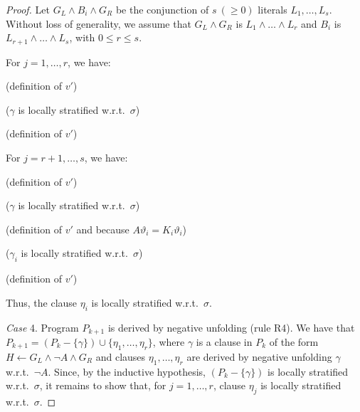 \documentclass[english]{tlp}
\begin{document}
\begin{proof}
Let $G_L\wedge B_i\wedge G_R$ be the conjunction of $s\ (\geq 0)$
literals $L_1,\ldots, L_s$. Without loss of generality, we assume
that $G_{L}\wedge G_{R}$ is $L_1\wedge\ldots\wedge L_r$ and $B_i$ is
$L_{r+1}\wedge\ldots\wedge L_s$, with $0\leq r \leq s$.

\noindent For $j=1,\ldots,r$, we have:

\smallskip

  (definition of $v'$)

\hspace*{1.75cm}  ($\gamma$
is locally stratified w.r.t.~$\sigma$)

\hspace*{1.75cm} 
(definition of $v'$)

\smallskip

\noindent \noindent For $j=r+1,\ldots,s$, we have:


\smallskip

  (definition of $v'$)

\hspace*{1.75cm}  ($\gamma$ is
locally stratified w.r.t.~$\sigma$)

\hspace*{1.75cm}  (definition of
$v'$ and because $A\vartheta_i=K_i\vartheta_i$)

\hspace*{1.75cm} 
($\gamma_i$ is locally stratified w.r.t.~$\sigma$)

\hspace*{1.75cm} 
(definition of $v'$)

\smallskip

\noindent Thus, the clause \( \eta _{i} \) is locally stratified
w.r.t.~\( \sigma  \).

\medskip

\noindent \emph{Case} 4. Program \( P_{k+1} \) is derived by
negative unfolding (rule R4). We have that \(
P_{k+1}=(P_{k}-\{\gamma \})\cup \{\eta _{1},\ldots ,\eta _{r}\} \),
where \( \gamma  \) is a clause in \( P_{k} \) of the form \(
H\leftarrow G_{L}\wedge \neg A\wedge G_{R} \) and clauses \( \eta
_{1},\ldots ,\eta _{r} \) are derived by negative unfolding \(
\gamma \) w.r.t.~\( \neg A \). Since, by the inductive hypothesis,
\( (P_{k}-\{\gamma \}) \) is locally stratified w.r.t.~\( \sigma \),
it remains to show that, for \( j=1,\ldots ,r \), clause \( \eta
_{j} \) is locally stratified w.r.t.~\( \sigma  \).


\end{proof}
\end{document}

